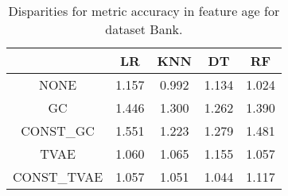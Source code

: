 \begin{table}
\caption{Disparities for metric accuracy in feature age for dataset Bank.}
\label{tab:disp-BANK-age-accuracy}
\begin{tabular}{ccccc}
\toprule
 & LR & KNN & DT & RF \\
\midrule
NONE & 1.157 & 0.992 & 1.134 & 1.024 \\
GC & 1.446 & 1.300 & 1.262 & 1.390 \\
CONST\_GC & 1.551 & 1.223 & 1.279 & 1.481 \\
TVAE & 1.060 & 1.065 & 1.155 & 1.057 \\
CONST\_TVAE & 1.057 & 1.051 & 1.044 & 1.117 \\
\bottomrule
\end{tabular}
\end{table}
